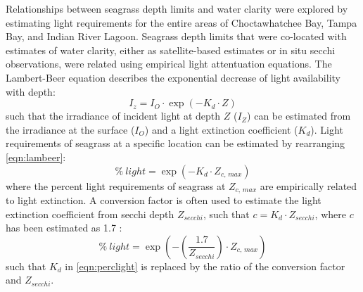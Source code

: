 \documentclass[letterpaper,12pt,oneside]{article}\usepackage[]{graphicx}\usepackage[]{color}
\begin{document}
Relationships between seagrass depth limits and water clarity were explored by estimating light requirements for the entire areas of Choctawhatchee Bay, Tampa Bay, and Indian River Lagoon.  Seagrass depth limits that were co-located with estimates of water clarity, either as satellite-based estimates or in situ secchi observations, were related using empirical light attentuation equations.  The Lambert-Beer equation describes the exponential decrease of light availability with depth:
\begin{equation} \label{eqn:lambeer}
I_{z} = I_{O} \cdot \exp\left(-K_{d} \cdot Z\right)
\end{equation}
\noindent such that the irradiance of incident light at depth $Z$ ($I_{Z}$) can be estimated from the irradiance at the surface ($I_{O}$) and a light extinction coefficient ($K_{d}$). Light requirements of seagrass at a specific location can be estimated by rearranging \cref{eqn:lambeer}:
\begin{equation} \label{eqn:perclight}
\% \ light = \exp\left(-K_{d} \cdot Z_{c,\,max}\right)
\end{equation}
\noindent where the percent light requirements of seagrass at $Z_{c,\,max}$ are empirically related to light extinction. A conversion factor is often used to estimate the light extinction coefficient from secchi depth $Z_{secchi}$, such that $c = K_{d} \cdot Z_{secchi}$, where $c$ has been estimated as 1.7 \citep{Poole29,Idso74}:
\begin{equation} \label{eqn:cperclight}
\% \ light = \exp\left(-\left(\frac{1.7}{Z_{secchi}}\right)\cdot Z_{c,\,max}\right)
\end{equation}
\noindent such that $K_d$ in \cref{eqn:perclight} is replaced by the ratio of the conversion factor and $Z_{secchi}$.
\end{document}
